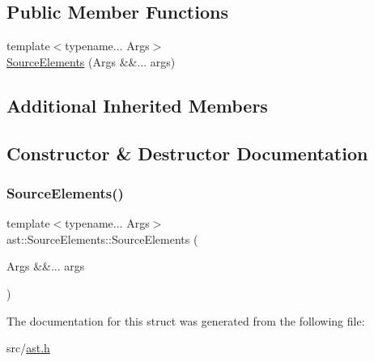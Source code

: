 \subsection*{Public Member Functions}
\begin{DoxyCompactItemize}
\item 
{\footnotesize template$<$typename... Args$>$ }\\\hyperlink{structast_1_1_source_elements_a4fd4dae26090b646897db509bc33a36d}{Source\+Elements} (Args \&\&... args)
\end{DoxyCompactItemize}
\subsection*{Additional Inherited Members}


\subsection{Constructor \& Destructor Documentation}
\mbox{\label{structast_1_1_source_elements_a4fd4dae26090b646897db509bc33a36d}} 
\subsubsection{\texorpdfstring{Source\+Elements()}{SourceElements()}}
{\footnotesize\ttfamily template$<$typename... Args$>$ \\
ast\+::\+Source\+Elements\+::\+Source\+Elements (\begin{DoxyParamCaption}\item[{Args \&\&...}]{args }\end{DoxyParamCaption})\hspace{0.3cm}{\ttfamily [inline]}}



The documentation for this struct was generated from the following file\+:\begin{DoxyCompactItemize}
\item 
src/\hyperlink{ast_8h}{ast.\+h}\end{DoxyCompactItemize}
